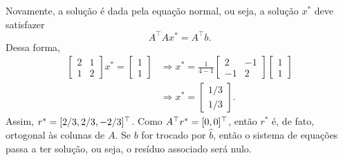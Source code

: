\begin{questions}
\begin{solution}
    Novamente, a solução é dada pela equação normal, ou seja, a solução $x^*$ deve satisfazer
    \[A^\top A x^* = A^\top b.\]
    Dessa forma,
    \begin{align*}
        \begin{bmatrix}
            2  &   1  \\
            1  &   2
        \end{bmatrix}
        x^* =
        \begin{bmatrix}
            1\\ 1
        \end{bmatrix}
        &\Rightarrow
        x^* = \frac{1}{4-1}
        \begin{bmatrix}
            2  & -1 \\
            -1 & 2
        \end{bmatrix}
        \begin{bmatrix}
            1 \\ 1
        \end{bmatrix}\\
        &\Rightarrow
        \boxed{
        x^* = 
        \begin{bmatrix}
            1/3\\ 1/3
        \end{bmatrix}
        }.
    \end{align*}
    Assim, $r^* = [2/3,2/3,-2/3]^\top$. Como $A^\top r^*= [0,0]^\top$, então $r^*$ é, de fato, ortogonal às colunas de $A$. Se $b$ for trocado por $\hat b$, então o sistema de equações passa a ter solução, ou seja, o resíduo associado será nulo.
\end{solution}


\end{questions}
